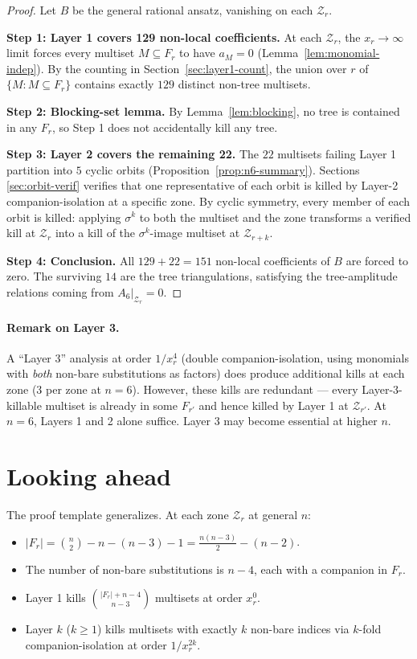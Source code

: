 \documentclass[11pt]{article}
\newcommand{\Z}{\mathcal{Z}}
\theoremstyle{definition}
\begin{document}
\begin{proof}
Let $B$ be the general rational ansatz, vanishing on each $\Z_r$.

\textbf{Step 1: Layer 1 covers 129 non-local coefficients.} At each $\Z_r$,
the $x_r\to\infty$ limit forces every multiset $M\subseteq F_r$ to have
$a_M = 0$ (Lemma~\ref{lem:monomial-indep}). By the counting in
Section~\ref{sec:layer1-count}, the union over $r$ of $\{M : M\subseteq F_r\}$
contains exactly $129$ distinct non-tree multisets.

\textbf{Step 2: Blocking-set lemma.} By Lemma~\ref{lem:blocking}, no tree
is contained in any $F_r$, so Step 1 does not accidentally kill any tree.

\textbf{Step 3: Layer 2 covers the remaining 22.} The $22$ multisets
failing Layer 1 partition into $5$ cyclic orbits
(Proposition~\ref{prop:n6-summary}). Sections \ref{sec:orbit-verif}
verifies that one representative of each orbit is killed by Layer-2
companion-isolation at a specific zone. By cyclic symmetry, every member
of each orbit is killed: applying $\sigma^k$ to both the multiset and the
zone transforms a verified kill at $\Z_r$ into a kill of the $\sigma^k$-image
multiset at $\Z_{r+k}$.

\textbf{Step 4: Conclusion.} All $129 + 22 = 151$ non-local coefficients
of $B$ are forced to zero. The surviving $14$ are the tree triangulations,
satisfying the tree-amplitude relations coming from $A_6|_{\Z_r}=0$.
\end{proof}

\paragraph{Remark on Layer 3.} A ``Layer 3'' analysis at order $1/x_r^4$
(double companion-isolation, using monomials with \emph{both} non-bare
substitutions as factors) does produce additional kills at each zone
($3$ per zone at $n=6$). However, these kills are redundant — every
Layer-3-killable multiset is already in some $F_{r'}$ and hence killed by
Layer 1 at $\Z_{r'}$. At $n=6$, Layers 1 and 2 alone suffice. Layer 3 may
become essential at higher $n$.

\section{Looking ahead}

The proof template generalizes. At each zone $\Z_r$ at general $n$:
\begin{itemize}[nosep,leftmargin=2em]
\item $|F_r| = \binom{n}{2}-n - (n-3) - 1 = \frac{n(n-3)}{2}-(n-2)$.
\item The number of non-bare substitutions is $n-4$, each with a companion
in $F_r$.
\item Layer 1 kills $\binom{|F_r|+n-4}{n-3}$ multisets at order $x_r^0$.
\item Layer $k$ ($k\ge 1$) kills multisets with exactly $k$ non-bare indices
via $k$-fold companion-isolation at order $1/x_r^{2k}$.
\end{itemize}
\end{document}
